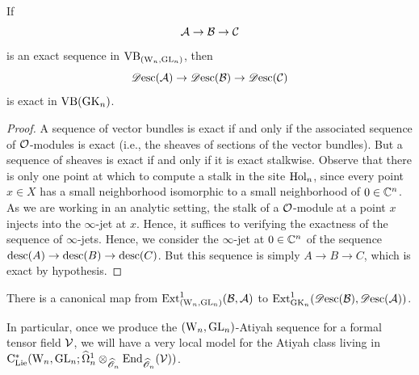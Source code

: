 \begin{lem}
If $$\mathcal A \to \mathcal B \to \mathcal C$$ is an exact sequence in ${\rm VB}_{({{\rm W}_n}, {\rm GL}_n)}$, then 
$$\mathscr{D}{\rm esc}(\mathcal A) \to \mathscr{D}{\rm esc}(\mathcal B) \to \mathscr{D}{\rm esc}(\mathcal C)$$ 
is exact in ${\rm VB}({\rm GK}_n)$.
\end{lem}

\begin{proof}
A sequence of vector bundles is exact if and only if the associated
sequence of $\mathcal O$-modules is exact (i.e., the sheaves of sections of
the vector bundles). But a sequence of sheaves is exact if and only if
it is exact stalkwise. Observe that there is only one point at which
to compute a stalk in the site ${\rm Hol}_n$, since every point $x \in X$
has a small neighborhood isomorphic to a small neighborhood of $0 \in
\mathbb C^n$. As we are working in an analytic setting, the stalk of a
$\mathcal O$-module at a point $x$ injects into the $\infty$-jet at
$x$. Hence, it suffices to verifying the exactness of the sequence of
$\infty$-jets. Hence, we consider the $\infty$-jet at $0 \in \mathbb C^n$ of
the sequence ${\rm desc}(A) \to {\rm desc}(B) \to {\rm desc}(C)$. But
this sequence is simply $A \to B \to C$, which is exact by
hypothesis.
\end{proof}

\begin{cor}
There is a canonical map from ${\rm Ext}^1_{({{\rm W}_n}, {\rm GL}_n)}(\mathcal B,\mathcal A)$ to ${\rm Ext}^1_{{\rm GK}_n}(\mathscr{D}{\rm esc}(\mathcal B), \mathscr{D}{\rm esc}(\mathcal A))$.
\end{cor}

In particular, once we produce the $({{\rm W}_n}, {\rm GL}_n)$-Atiyah sequence for a formal tensor field $\mathcal{V}$, 
we will have a very local model for the Atiyah class living in ${\rm C}_{{\rm Lie}}^*({{\rm W}_n},{\rm GL}_n; \widehat{\Omega}^1_n \otimes_{\widehat{\mathscr O}_n} {\rm End}_{\widehat{\mathscr O}_n}(\mathcal{V}))$.


